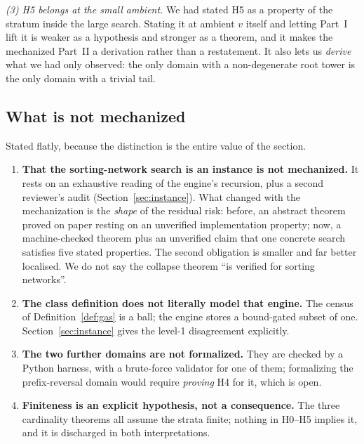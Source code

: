 \documentclass[11pt,a4paper]{article}
\theoremstyle{plain}
\theoremstyle{definition}
\theoremstyle{remark}
\begin{document}
\emph{(3) H5 belongs at the small ambient.} We had stated H5 as a property of
the stratum inside the large search. Stating it at ambient $v$ itself and
letting Part~I lift it is weaker as a hypothesis and stronger as a theorem, and
it makes the mechanized Part~II a derivation rather than a restatement. It also
lets us \emph{derive} what we had only observed: the only domain with a
non-degenerate root tower is the only domain with a trivial tail.

\subsection{What is not mechanized}\label{sec:notmech}

Stated flatly, because the distinction is the entire value of the section.

\begin{enumerate}\itemsep2pt
\item \textbf{That the sorting-network search is an instance is not
  mechanized.} It rests on an exhaustive reading of the engine's recursion,
  plus a second reviewer's audit (Section~\ref{sec:instance}). What changed
  with the mechanization is the \emph{shape} of the residual risk: before, an
  abstract theorem proved on paper resting on an unverified implementation
  property; now, a machine-checked theorem plus an unverified claim that one
  concrete search satisfies five stated properties. The second obligation is
  smaller and far better localised. We do not say the collapse theorem ``is
  verified for sorting networks''.
\item \textbf{The class definition does not literally model that engine.} The
  census of Definition~\ref{def:gas} is a ball; the engine stores a bound-gated
  subset of one. Section~\ref{sec:instance} gives the level-1 disagreement
  explicitly.
\item \textbf{The two further domains are not formalized.} They are checked by
  a Python harness, with a brute-force validator for one of them; formalizing
  the prefix-reversal domain would require \emph{proving} H4 for it, which is
  open.
\item \textbf{Finiteness is an explicit hypothesis, not a consequence.} The
  three cardinality theorems all assume the strata finite; nothing in H0--H5
  implies it, and it is discharged in both interpretations.
\end{enumerate}

\end{document}
